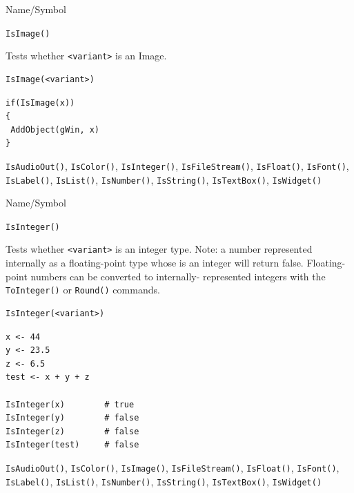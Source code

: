 \begin{desc}{Name/Symbol}
\item[Name/Symbol]	\verb+IsImage()+

\item[Description]	Tests whether \verb+<variant>+ is an Image.

\item[Usage]
\begin{verbatim}
IsImage(<variant>)
\end{verbatim}

\item[Example]	
\begin{verbatim}
if(IsImage(x))
{
 AddObject(gWin, x)
}
\end{verbatim}

\item[See Also] \verb+IsAudioOut()+, \verb+IsColor()+,
  \verb+IsInteger()+, \verb+IsFileStream()+, \verb+IsFloat()+,
  \verb+IsFont()+, \verb+IsLabel()+, \verb+IsList()+,
  \verb+IsNumber()+, \verb+IsString()+, \verb+IsTextBox()+,
  \verb+IsWidget()+
\end{desc}



\begin{desc}{Name/Symbol}
\item[Name/Symbol]	\verb+IsInteger()+

\item[Description] Tests whether \verb+<variant>+ is an integer type.
  Note: a number represented internally as a floating-point type whose
  is an integer will return false.  Floating-point numbers can be
  converted to internally- represented integers with the
  \verb+ToInteger()+ or \verb+Round()+ commands.
 
\item[Usage]		
\begin{verbatim}
IsInteger(<variant>)
\end{verbatim}

\item[Example]
\begin{verbatim}
x <- 44
y <- 23.5
z <- 6.5
test <- x + y + z 
	
IsInteger(x)		# true
IsInteger(y)		# false
IsInteger(z)		# false
IsInteger(test)		# false
\end{verbatim}

\item[See Also] \verb+IsAudioOut()+, \verb+IsColor()+,
  \verb+IsImage()+, \verb+IsFileStream()+, \verb+IsFloat()+,
  \verb+IsFont()+, \verb+IsLabel()+, \verb+IsList()+,
  \verb+IsNumber()+, \verb+IsString()+, \verb+IsTextBox()+,
  \verb+IsWidget()+
\end{desc}



